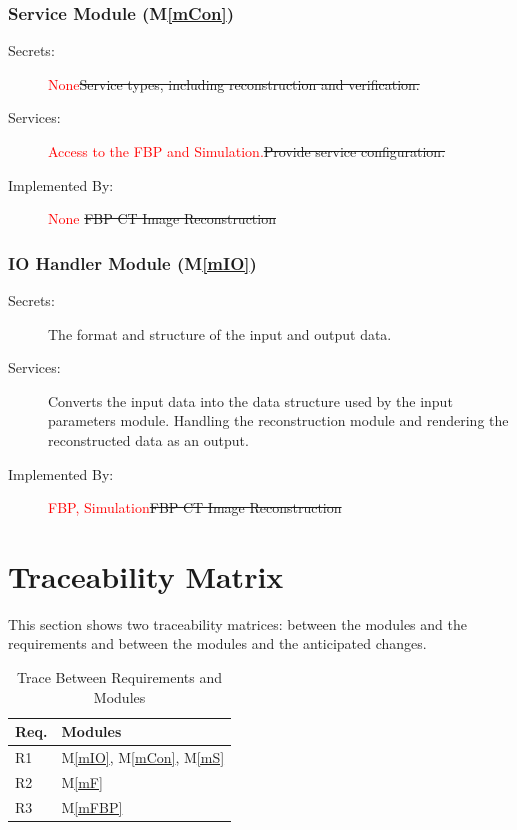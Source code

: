 \documentclass[12pt, titlepage]{article}
\newcommand{\mref}[1]{M\ref{#1}}
\newcommand{\add}{\textcolor{red}}
\begin{document}
\subsubsection{Service Module (\mref{mCon})}

\begin{cross}
\begin{description}
\item[Secrets:] \add{None}\st{Service types, including reconstruction and verification.}
\item[Services:] \add{Access to the FBP and Simulation.}\st{Provide service configuration.}
\item[Implemented By:] \add{None} \st{FBP CT Image Reconstruction}
\end{description}
\end{cross}



\subsubsection{IO Handler Module (\mref{mIO})}

\begin{description}
\item[Secrets:]The format and structure of the input and output data.
\item[Services:]Converts the input data into the data structure used by the
  input parameters module.
  Handling the reconstruction module and rendering the reconstructed data as an output.
\item[Implemented By:] \add{FBP, Simulation}\st{FBP CT Image Reconstruction}
\end{description}


\section{Traceability Matrix} \label{SecTM}

This section shows two traceability matrices: between the modules and the
requirements and between the modules and the anticipated changes.

\begin{table}[H]
\centering
\begin{tabular}{p{} p{}}
\toprule
\textbf{Req.} & \textbf{Modules}\\
\midrule
R1 & \mref{mIO}, \mref{mCon}, \mref{mS}\\
R2 & \mref{mF}\\
R3 & \mref{mFBP}\\
\bottomrule
\end{tabular}
\caption{Trace Between Requirements and Modules}
\label{TblRT}
\end{table}
\end{document}
